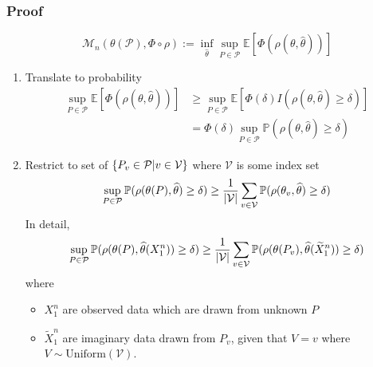 \documentclass[10pt,xcolor={usenames,dvipsnames,table},aspectratio=169]{beamer}
\begin{document}
\begin{frame}
    \frametitle{Proof}
    \[
    \mathcal{M}_n(\theta(\mathcal{P}), \Phi \circ \rho) := \inf_{\widehat{\theta}} \sup_{P \in \mathcal{P}} \mathbb{E} \left[  \Phi(\rho(\theta, \widehat{\theta})) \right]
    \] 

    \begin{enumerate}
        \item Translate to probability
    \begin{align*}
        \sup_{P \in \mathcal{P}} \mathbb{E}[\Phi(\rho(\theta, \widehat{\theta}))] 
        &\geq \sup_{P \in \mathcal{P}} \mathbb{E}[\Phi(\delta) I(\rho(\theta, \widehat{\theta}) \geq \delta)] \\
        &= \Phi(\delta) \sup_{P \in \mathcal{P}} \mathbb{P}(\rho(\theta, \widehat{\theta}) \geq \delta)
    \end{align*}
\item Restrict to set of $\left\{P_v \in \mathcal{P} | v \in \mathcal{V}\right\}$ where $\mathcal{V}$ is some index set
    \[
    \sup_{P \in \mathcal{P}} \mathbb{P}(\rho(\theta(P), \widehat{\theta}) \geq \delta) \geq \dfrac{1}{\left\lvert\mathcal{V}\right\rvert} \sum_{v \in \mathcal{V}} \mathbb{P}(\rho(\theta_v, \widehat{\theta}) \geq \delta)
    \] 
    In detail,
    \[
    \sup_{P \in \mathcal{P}} \mathbb{P}(\rho(\theta(P), \widehat{\theta}(X_1^{n})) \geq \delta) \geq \dfrac{1}{\left\lvert\mathcal{V}\right\rvert} \sum_{v \in \mathcal{V}} \mathbb{P}(\rho(\theta(P_v), \widehat{\theta}(\widetilde{X}_1^{n})) \geq \delta)
    \] 
    where 
    \begin{itemize}
        \item $X_1^{n}$ are observed data which are drawn from unknown $P$ 
        \item $\widetilde{X}_1^{n}$ are imaginary data drawn from $P_v$, given that $V=v$ where  $V \sim \text{Uniform}(\mathcal{V})$. 
    \end{itemize}
    \end{enumerate}
\end{frame}
\end{document}

